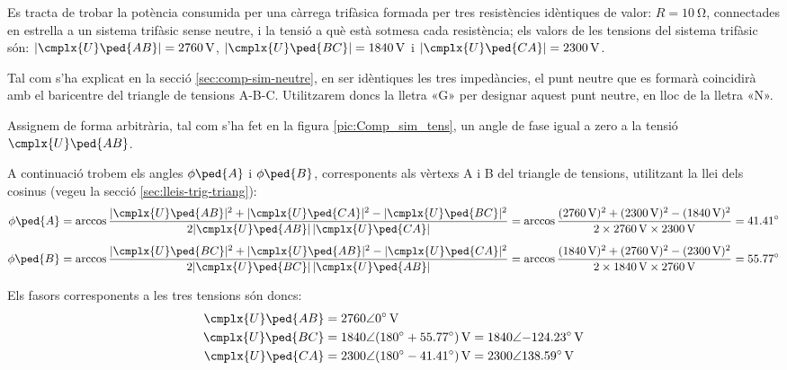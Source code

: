 \begin{exemple}\label{ex:ImpedEquil}
	\addcontentsxms{\ImpedEquil}
    Es tracta de trobar la potència consumida per una càrrega trifàsica
    formada per tres resistències idèntiques de valor: $R=\qty{10}{\ohm}$,
    connectades en estrella a un sistema trifàsic sense neutre, i la
    tensió a què està sotmesa cada resistència; els valors de les
    tensions del sistema trifàsic són: $|\cmplx{U}\ped{AB}| =
    \qty{2760}{V}$, $|\cmplx{U}\ped{BC}| = \qty{1840}{V}$ i
    $|\cmplx{U}\ped{CA}| = \qty{2300}{V}$.

    Tal com s'ha explicat en la secció \vref{sec:comp-sim-neutre}, en ser idèntiques les tres impedàncies, el punt neutre que es formarà coincidirà amb el baricentre del triangle de tensions A-B-C. Utilitzarem doncs la lletra «G» per designar aquest punt neutre, en lloc de la lletra «N».

    Assignem de forma arbitrària, tal com s'ha fet en la figura
    \vref{pic:Comp_sim_tens}, un angle de fase igual a zero a la tensió
    $\cmplx{U}\ped{AB}$.

    \begin{center}
        
    \end{center}

    A continuació trobem els angles $\phi\ped{A}$ i $\phi\ped{B}$,
    corresponents als vèrtexs  A i B del triangle de
    tensions, utilitzant la llei dels cosinus (vegeu la secció
    \vref{sec:lleis-trig-triang}): 
    \begin{align*}
        \phi\ped{A} &= \arccos \frac{|\cmplx{U}\ped{AB}|^2 + |\cmplx{U}\ped{CA}|^2 -
        |\cmplx{U}\ped{BC}|^2}{2 |\cmplx{U}\ped{AB}| \,|\cmplx{U}\ped{CA}|} =
        \arccos \frac{(\qty{2760}{V})^2 + (\qty{2300}{V})^2 - (\qty{1840}{V})^2}{2 \times \qty{2760}{V}
        \times \qty{2300}{V}} = \ang{41,41} \\[1ex]
        \phi\ped{B} &= \arccos \frac{|\cmplx{U}\ped{BC}|^2 + |\cmplx{U}\ped{AB}|^2 -
        |\cmplx{U}\ped{CA}|^2}{2 |\cmplx{U}\ped{BC}| \,|\cmplx{U}\ped{AB}|} =
        \arccos \frac{(\qty{1840}{V})^2 + (\qty{2760}{V})^2 - (\qty{2300}{V})^2}{2 \times \qty{1840}{V}
        \times \qty{2760}{V}} = \ang{55,77}
    \end{align*}

    Els fasors corresponents a les tres tensions són doncs:
    \begin{align*}
    \cmplx{U}\ped{AB} &= \complexqty{2760:0}{V} \\
    \cmplx{U}\ped{BC} &= \num{1840}\angle(\ang{180} + \ang{55,77})\unit{\,V} =
    \complexqty{1840:-124,23}{V} \\
    \cmplx{U}\ped{CA} &= \num{2300}\angle(\ang{180} - \ang{41,41})\unit{\,V} = \complexqty{2300:138,59}{V} 
    \end{align*}


\end{exemple}
